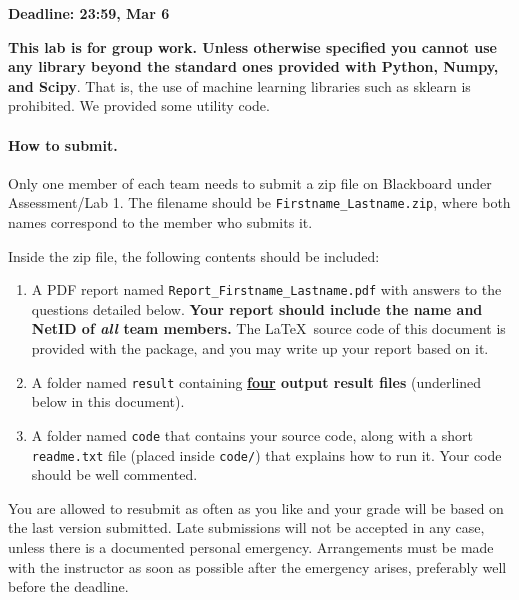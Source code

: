 \documentclass[11pt]{report}
\begin{document}
\maketitle

{\bf Deadline: 23:59, Mar 6}


{\bf This lab is for group work.
Unless otherwise specified you cannot use any library beyond the standard ones provided with Python, Numpy, and Scipy}.
That is, the use of machine learning libraries such as sklearn is prohibited.
We provided some utility code.



\paragraph{How to submit.}

Only one member of each team needs to submit a zip file on Blackboard under Assessment/Lab 1.
The filename should be \verb#Firstname_Lastname.zip#,
where both names correspond to the member who submits it.


Inside the zip file, the following contents should be included:
\begin{enumerate}
	\item  A PDF report named \verb#Report_Firstname_Lastname.pdf# with answers to the questions detailed below.
	{\bf Your report should include the name and NetID of \emph{all} team members.}
	The \LaTeX\ source code of this document is provided with the package, and you may write up your report based on it.
	\item A folder named \verb#result# containing {\bf \underline{four} output result files} (underlined below in this document).
	\item A folder named \verb#code# that contains your source code, along with a short \verb#readme.txt# file (placed inside \verb#code/#) that explains how to run it.
		Your code should be well commented.
\end{enumerate}



You are allowed to resubmit as often as you like and your grade will be based on the last version submitted.
Late submissions will not be accepted in any case, 
unless there is a documented personal emergency.  
Arrangements must be made with the instructor as soon as possible after the emergency arises,
preferably well before the deadline.
\end{document}
